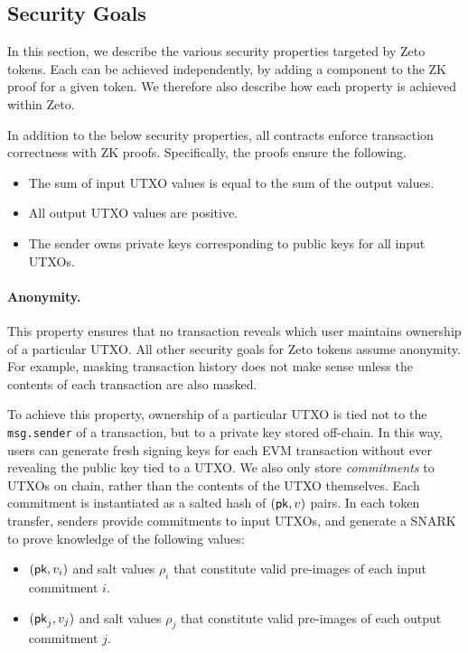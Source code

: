 \subsection{Security Goals}


In this section, we describe the various security properties targeted by Zeto tokens. Each can be achieved independently, by adding a component to the ZK proof for a given token. We therefore also describe how each property is achieved within Zeto.

In addition to the below security properties, all contracts enforce transaction correctness with ZK proofs. Specifically, the proofs ensure the following.
\begin{itemize}
  \item The sum of input UTXO values is equal to the sum of the output values.
  \item All output UTXO values are positive.
  \item The sender owns private keys corresponding to public keys for all input UTXOs.
\end{itemize}

\paragraph{Anonymity.} This property ensures that no transaction reveals which user maintains ownership of a particular UTXO. All other security goals for Zeto tokens assume anonymity. For example, masking transaction history does not make sense unless the contents of each transaction are also masked.

To achieve this property, ownership of a particular UTXO is tied not to the \texttt{msg.sender} of a transaction, but to a private key stored off-chain. In this way, users can generate fresh signing keys for each EVM transaction without ever revealing the public key tied to a UTXO. We also only store \textit{commitments} to UTXOs on chain, rather than the contents of the UTXO themselves. Each commitment is instantiated as a salted hash of $(\mathsf{pk}, v)$ pairs. In each token transfer, senders provide commitments to input UTXOs, and generate a SNARK to prove knowledge of the following values:
\begin{itemize}
  \item $(\mathsf{pk}, v_i)$ and salt values $\rho_i$ that constitute valid pre-images of each input commitment $i$.
  \item $(\mathsf{pk}_j, v_j)$ and salt values $\rho_j$ that constitute valid pre-images of each output commitment $j$.
\end{itemize}


